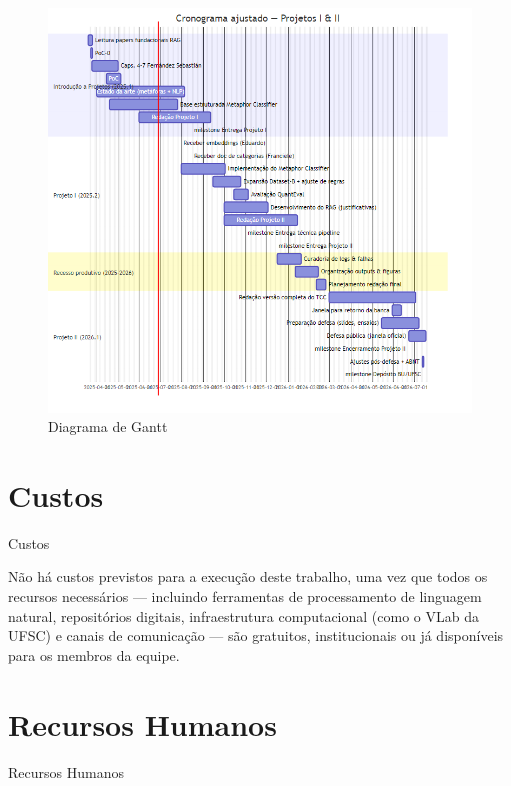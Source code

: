 \begin{figure}[H]
  \centering
  \includegraphics[height=0.7\textheight,keepaspectratio]{pictures/gantt.png}
  \caption{Diagrama de Gantt}
  \label{fig:gantt}
\end{figure}

\section{\textbf{Custos}}{Custos}\label{custos}

Não há custos previstos para a execução deste trabalho, uma vez que
todos os recursos necessários --- incluindo ferramentas de processamento
de linguagem natural, repositórios digitais, infraestrutura
computacional (como o VLab da UFSC) e canais de comunicação --- são
gratuitos, institucionais ou já disponíveis para os membros da equipe.

\section{\textbf{Recursos
Humanos}}{Recursos Humanos}\label{recursos-humanos}

